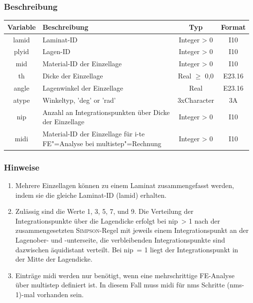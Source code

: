 \documentclass[11pt,titlepage,listof=totoc,bibliography=totoc,twoside]{scrreprt}
\begin{document}
{{\subsubsection{Beschreibung}

\begin{tabularx}{\textwidth}{cXcc}
\toprule
Variable  & Beschreibung  & Typ          & Format  \\ \midrule
lamid     & Laminat-ID    & Integer > 0  & I10     \\
plyid     & Lagen-ID      & Integer > 0  & I10     \\
mid       & Material-ID der Einzellage  & Integer > 0  & I10  \\
th        & Dicke der Einzellage & Real $\geq$ 0{,}0 & E23.16  \\
angle     & Lagenwinkel der Einzellage & Real & E23.16  \\
atype     & Winkeltyp, 'deg' or 'rad' & 3xCharacter & 3A  \\
nip       & Anzahl an Integrationspunkten über Dicke der Einzellage & Integer > 0 & I10  \\
midi      & Material-ID der Einzellage für i-te FE"=Analyse bei multistep"=Rechnung & Integer > 0 & I10  \\
\bottomrule
\end{tabularx}

\subsubsection{Hinweise}

\begin{enumerate}
 \item Mehrere Einzellagen können zu einem Laminat zusammengefasst werden, indem sie die gleiche Laminat-ID (lamid) erhalten.
 \item Zulässig sind die Werte 1, 3, 5, 7, und 9. Die Verteilung der Integrationspunkte über die Lagendicke erfolgt bei nip~> 1 nach der zusammengesetzten \textsc{Simpson}-Regel mit jeweils einem Integrationspunkt an der Lagenober- und -unterseite, die verbleibenden Integrationspunkte sind dazwischen äquidistant verteilt. Bei nip~= 1 liegt der Integrationspunkt in der Mitte der Lagendicke.
 \item Einträge midi werden nur benötigt, wenn eine mehrschrittige FE-Analyse über multistep definiert ist. In diesem Fall muss midi für nms Schritte (nms-1)-mal vorhanden sein.
\end{enumerate}

}}
\end{document}
